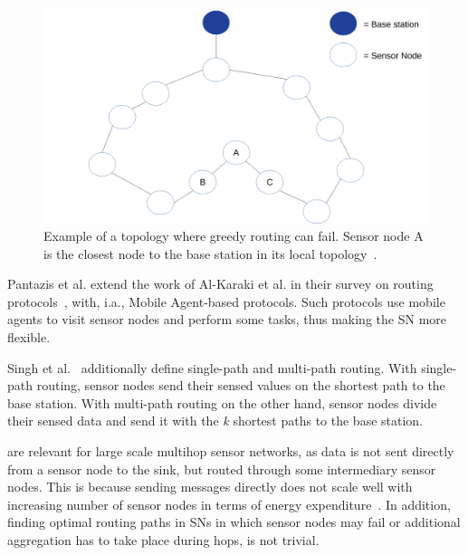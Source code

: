 \begin{figure}[h]
\includegraphics[width=\linewidth]{images/pager-shadow-nodes.pdf}
\caption{Example of a topology where greedy routing can fail. Sensor node A is
the closest node to the base station in its local topology~\cite{zou2004pager}.}
\label{fig:shadow nodes}
\centering
\end{figure}

Pantazis et al. extend the work of Al-Karaki et al. in their survey on routing
protocols~\cite{pantazis2013energy}, with, i.a., Mobile Agent-based protocols.
Such protocols use mobile agents to visit sensor nodes and perform some tasks,
thus making the \ac{SN} more flexible. %

Singh et al.~\cite{singh2010routing} additionally define single-path and
multi-path routing. With single-path routing, sensor nodes send their sensed
values on the shortest path to the base station. With multi-path routing on the
other hand, sensor nodes divide their sensed data and send it with the
\textit{k} shortest paths to the base station. %

are relevant for large scale multihop sensor networks,
as data is not sent directly from a sensor node to the sink, but routed through
some intermediary sensor nodes. This is because sending messages directly does
not scale well with increasing number of sensor nodes in terms of energy
expenditure~\cite{padhy2006utility}. In addition, finding optimal routing paths
in \acp{SN} in which sensor nodes may fail or additional aggregation has to
take place during hops, is not trivial.

